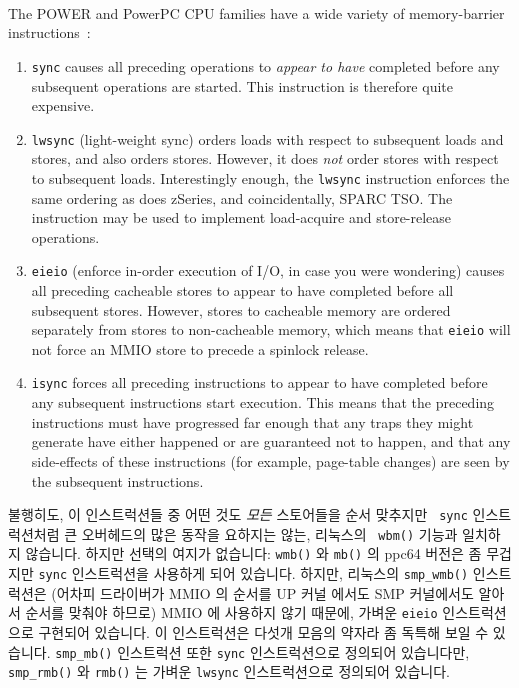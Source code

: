The POWER and PowerPC\textsuperscript{\textregistered}
CPU families have a wide variety of memory-barrier
instructions~\cite{PowerPC94,MichaelLyons02a}:
\begin{enumerate}
\item	{\tt sync} causes all preceding operations to {\em appear to have}
	completed before any subsequent operations are started.
	This instruction is therefore quite expensive.
\item	{\tt lwsync} (light-weight sync) orders loads with respect to
	subsequent loads and stores, and also orders stores.
	However, it does {\em not} order stores with respect to subsequent
	loads.
	Interestingly enough, the {\tt lwsync} instruction enforces
	the same ordering as does zSeries, and coincidentally,
	SPARC TSO.
	The  instruction may be used to implement
	load-acquire and store-release operations.
\item	{\tt eieio} (enforce in-order execution of I/O, in case you
	were wondering) causes all preceding cacheable stores to appear
	to have completed before all subsequent stores.
	However, stores to cacheable memory are ordered separately from
	stores to non-cacheable memory, which means that {\tt eieio}
	will not force an MMIO store to precede a spinlock release.
\item	{\tt isync} forces all preceding instructions to appear to have
	completed before any subsequent instructions start execution.
	This means that the preceding instructions must have progressed
	far enough that any traps they might generate have either happened
	or are guaranteed not to happen, and that any side-effects of
	these instructions (for example, page-table changes) are seen by the
	subsequent instructions.
\end{enumerate}
\fi

불행히도, 이 인스트럭션들 중 어떤 것도 {\em 모든} 스토어들을 순서 맞추지만 {\tt
sync} 인스트럭션처럼 큰 오버헤드의 많은 동작을 요하지는 않는, 리눅스의 {\tt
wbm()} 기능과 일치하지 않습니다.
하지만 선택의 여지가 없습니다: {\tt wmb()} 와 {\tt mb()} 의 ppc64 버전은 좀
무겁지만 {\tt sync} 인스트럭션을 사용하게 되어 있습니다.
하지만, 리눅스의 {\tt smp\_wmb()} 인스트럭션은 (어차피 드라이버가 MMIO 의
순서를 UP 커널 에서도 SMP 커널에서도 알아서 순서를 맞춰야 하므로) MMIO 에
사용하지 않기 때문에, 가벼운 {\tt eieio} 인스트럭션으로 구현되어 있습니다.
이 인스트럭션은 다섯개 모음의 약자라 좀 독특해 보일 수 있습니다.
{\tt smp\_mb()} 인스트럭션 또한 {\tt sync} 인스트럭션으로 정의되어 있습니다만,
{\tt smp\_rmb()} 와 {\tt rmb()} 는 가벼운 {\tt lwsync} 인스트럭션으로 정의되어
있습니다.
\iffalse

